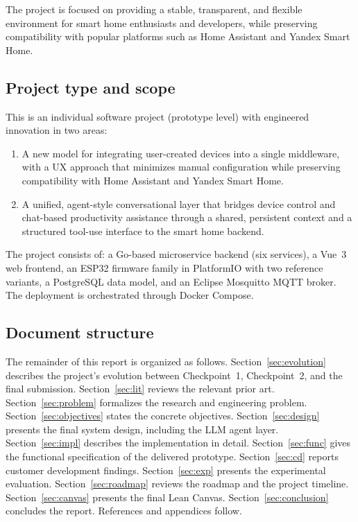 \documentclass[a4paper,12pt]{article}
\begin{document}
The project is focused on providing a stable, transparent, and flexible environment for smart home enthusiasts and developers, while preserving compatibility with popular platforms such as Home Assistant and Yandex Smart Home.

\subsection{Project type and scope}

This is an individual software project (prototype level) with engineered innovation in two areas:

\begin{enumerate}
  \item A new model for integrating user-created devices into a single middleware, with a UX approach that minimizes manual configuration while preserving compatibility with Home Assistant and Yandex Smart Home.
  \item A unified, agent-style conversational layer that bridges device control and chat-based productivity assistance through a shared, persistent context and a structured tool-use interface to the smart home backend.
\end{enumerate}

The project consists of: a Go-based microservice backend (six services), a Vue~3 web frontend, an ESP32 firmware family in PlatformIO with two reference variants, a PostgreSQL data model, and an Eclipse Mosquitto MQTT broker. The deployment is orchestrated through Docker Compose.

\subsection{Document structure}

The remainder of this report is organized as follows. Section~\ref{sec:evolution} describes the project's evolution between Checkpoint~1, Checkpoint~2, and the final submission. Section~\ref{sec:lit} reviews the relevant prior art. Section~\ref{sec:problem} formalizes the research and engineering problem. Section~\ref{sec:objectives} states the concrete objectives. Section~\ref{sec:design} presents the final system design, including the LLM agent layer. Section~\ref{sec:impl} describes the implementation in detail. Section~\ref{sec:func} gives the functional specification of the delivered prototype. Section~\ref{sec:cd} reports customer development findings. Section~\ref{sec:exp} presents the experimental evaluation. Section~\ref{sec:roadmap} reviews the roadmap and the project timeline. Section~\ref{sec:canvas} presents the final Lean Canvas. Section~\ref{sec:conclusion} concludes the report. References and appendices follow.
\end{document}
